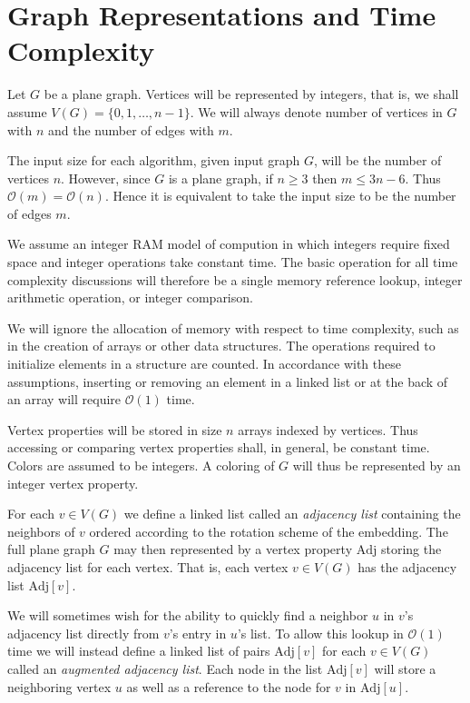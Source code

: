 \documentclass[letterpaper, 12pt]{article}
\theoremstyle{definition}
\theoremstyle{definition}
\theoremstyle{thm}
\theoremstyle{definition}
\begin{document}
\section{Graph Representations and Time Complexity}
Let $G$ be a plane graph. Vertices will be represented by integers, that is, we
shall assume $V(G)=\{0,1,\ldots,n-1\}$. We will always denote
number of vertices in $G$ with $n$ and the number of edges with $m$.

The input size for each algorithm, given input graph $G$, will be the
number of vertices $n$. However, since $G$ is a plane graph, if $n\ge 3$ then
$m\le 3n-6$. Thus $\mathcal{O}(m)= \mathcal{O}(n)$. Hence it is equivalent to
take the input size to be the number of edges $m$.

We assume an integer RAM model of compution in which integers require
fixed space and integer operations take constant time. The basic operation
for all time complexity discussions will therefore be a single memory reference
lookup, integer arithmetic operation, or integer comparison.

We will ignore the allocation of memory with respect to time complexity, such
as in the creation of arrays or other data structures. The operations
required to initialize elements in a structure are counted. In accordance
with these assumptions, inserting or removing an element in a linked list or at
the back of an array will require $\mathcal{O}(1)$ time.

Vertex properties will be stored in size $n$ arrays indexed by vertices. Thus accessing
or comparing vertex properties shall, in general, be constant time. Colors are assumed to be integers. A coloring of $G$ will thus be represented by
an integer vertex property.

For each $v\in V(G)$ we define a linked list called an
\emph{adjacency list} containing the neighbors of $v$ ordered according to
the rotation scheme of the embedding. The full plane graph $G$ may then
represented by a vertex property $\text{Adj}$ storing the adjacency list for
each vertex. That is, each vertex $v\in V(G)$ has the adjacency list $\text{Adj}[v]$.

We will sometimes wish for the ability to quickly find a neighbor $u$
in $v$'s adjacency list directly from $v$'s entry in $u$'s list. To allow this lookup in
$\mathcal{O}(1)$ time we will instead define a linked list of pairs $\text{Adj}[v]$ for
each $v\in V(G)$ called an \textit{augmented adjacency list}. Each node in the
list $\text{Adj}[v]$ will store a neighboring vertex $u$ as well as a reference
to the node for $v$ in $\text{Adj}[u]$.
\end{document}
